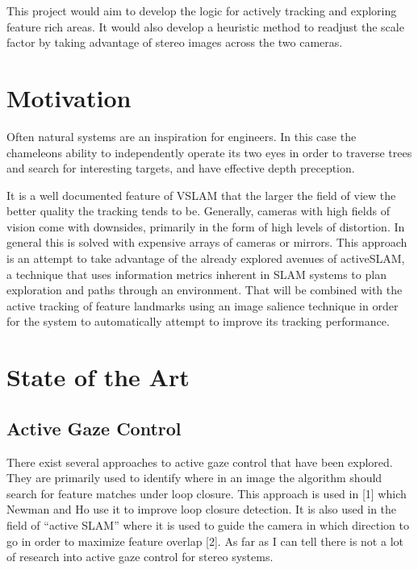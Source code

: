 \documentclass{article}
\begin{document}
This project would aim to develop the logic for actively tracking and exploring feature rich areas. It would also
develop a heuristic method to readjust the scale factor by taking advantage of stereo images across the two
cameras. 
\section{Motivation}
Often natural systems are an inspiration for engineers. In this case the chameleons ability to independently
operate its two eyes in order to traverse trees and search for interesting targets, and have effective depth
preception.

It is a well documented feature of VSLAM that the larger the field of view the better quality the tracking tends
to be. Generally, cameras with high fields of vision come with downsides, primarily in the form of high levels of
distortion. In general this is solved with expensive arrays of cameras or mirrors. This approach is an attempt to
take advantage of the already explored avenues of activeSLAM, a technique that uses information metrics inherent in
SLAM systems to plan exploration and paths through an environment. That will be combined with the active tracking
of feature landmarks using an image salience technique in order for the system to automatically attempt to improve
its tracking performance. 

\section{State of the Art}
\subsection{Active Gaze Control}
There exist several approaches to active gaze control that have been explored. They are primarily used to
identify where in an image the algorithm should search for feature matches under loop closure. This approach is
used in [1] which Newman and Ho use it to improve loop closure detection. It is also used in the field of
``active SLAM'' where it is used to guide the camera in which direction to go in order to maximize feature overlap
[2]. As far as I can tell there is not a lot of research into active gaze control for stereo systems.
\end{document}
